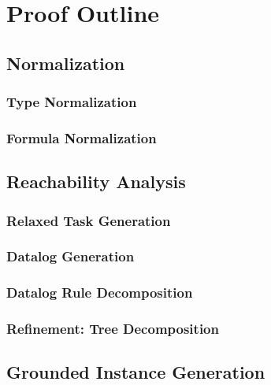 \chapter{Proof Outline}
\section{Normalization}
\subsection{Type Normalization}
\subsection{Formula Normalization}
\section{Reachability Analysis}
\subsection{Relaxed Task Generation}
\subsection{Datalog Generation}
\subsection{Datalog Rule Decomposition}
\subsection{Refinement: Tree Decomposition}
\section{Grounded Instance Generation}